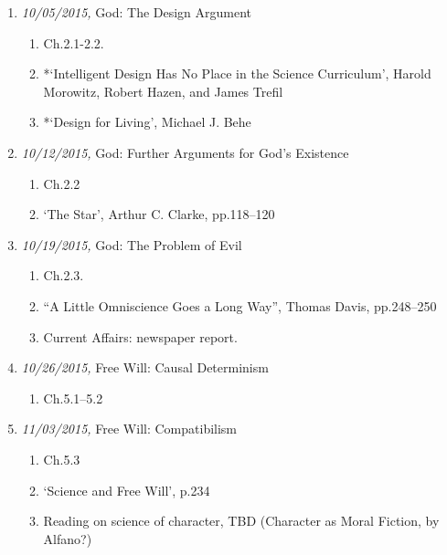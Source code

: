 \documentclass[11pt,article,oneside]{memoir}
\begin{document}
\begin{enumerate}
\item \textit{10/05/2015,} God: The Design Argument
\begin{enumerate}
\item Ch.2.1-2.2. 
\item *`Intelligent Design Has No Place in the Science Curriculum', Harold Morowitz, Robert Hazen, and James Trefil
 \item *`Design for Living', Michael J. Behe
 \end{enumerate}
 
\item \textit{10/12/2015,} God: Further Arguments for God's Existence
\begin{enumerate}
\item Ch.2.2
\item `The Star', Arthur C. Clarke, pp.118--120
\end{enumerate}

\item \textit{10/19/2015,} God: The Problem of Evil 
\begin{enumerate}
\item Ch.2.3.
\item ``A Little Omniscience Goes a Long Way'', Thomas Davis, pp.248--250
\item Current Affairs: newspaper report. 
\end{enumerate}

\item \textit{10/26/2015,} Free Will: Causal Determinism
\begin{enumerate}
\item Ch.5.1--5.2
\end{enumerate}

\item \textit{11/03/2015,} Free Will: Compatibilism
\begin{enumerate}
\item Ch.5.3
\item `Science and Free Will', p.234
\item Reading on science of character, TBD (Character as Moral Fiction, by Alfano?)
\end{enumerate}


\end{enumerate}
\end{document}
